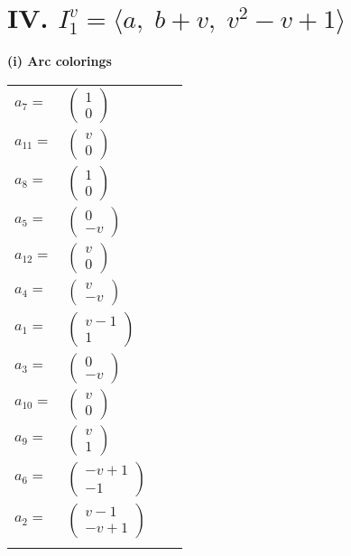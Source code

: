\documentclass[1p]{elsarticle_modified}
\theoremstyle{definition}
\begin{document}
\centering \section*{IV. $I^v_{1}= \langle a,\;b+v,\;v^2- v+1 \rangle$}
\flushleft \textbf{(i) Arc colorings}\\
\begin{tabular}{m{7pt} m{180pt} m{7pt} m{180pt} }
\flushright $a_{7}=$&$\begin{pmatrix}1\\0\end{pmatrix}$ \\
\flushright $a_{11}=$&$\begin{pmatrix}v\\0\end{pmatrix}$ \\
\flushright $a_{8}=$&$\begin{pmatrix}1\\0\end{pmatrix}$ \\
\flushright $a_{5}=$&$\begin{pmatrix}0\\- v\end{pmatrix}$ \\
\flushright $a_{12}=$&$\begin{pmatrix}v\\0\end{pmatrix}$ \\
\flushright $a_{4}=$&$\begin{pmatrix}v\\- v\end{pmatrix}$ \\
\flushright $a_{1}=$&$\begin{pmatrix}v-1\\1\end{pmatrix}$ \\
\flushright $a_{3}=$&$\begin{pmatrix}0\\- v\end{pmatrix}$ \\
\flushright $a_{10}=$&$\begin{pmatrix}v\\0\end{pmatrix}$ \\
\flushright $a_{9}=$&$\begin{pmatrix}v\\1\end{pmatrix}$ \\
\flushright $a_{6}=$&$\begin{pmatrix}- v+1\\-1\end{pmatrix}$ \\
\flushright $a_{2}=$&$\begin{pmatrix}v-1\\- v+1\end{pmatrix}$\\&\end{tabular}
\end{document}
